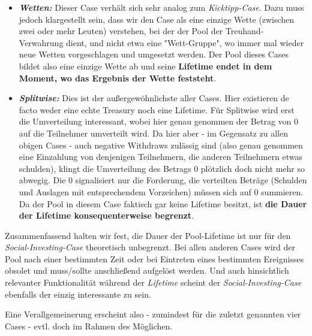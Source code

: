 \begin{itemize}
  \item \textbf{\textit{Wetten:}} Dieser Case verhält sich sehr analog zum \textit{Kicktipp-Case}. Dazu muss jedoch klargestellt sein, dass wir den Case als eine einzige Wette (zwischen zwei oder mehr Leuten) verstehen, bei der der Pool der Treuhand-Verwahrung dient, und nicht etwa eine "Wett-Gruppe", wo immer mal wieder neue Wetten vorgeschlagen und umgesetzt werden. Der Pool dieses Cases bildet also eine einzige Wette ab und seine \textbf{Lifetime endet in dem Moment, wo das Ergebnis der Wette feststeht}.
  \item \textbf{\textit{Splitwise:}} Dies ist der außergewöhnlichste aller Cases. Hier existieren de facto weder eine echte Treasury noch eine Lifetime. Für Splitwise wird erst die Umverteilung interessant, wobei hier genau genommen der Betrag von 0 auf die Teilnehmer umverteilt wird. Da hier aber - im Gegensatz zu allen obigen Cases - auch negative Withdraws zulässig sind (also genau genommen eine Einzahlung von denjenigen Teilnehmern, die anderen Teilnehmern etwas schulden), klingt die Umverteilung des Betrags 0 plötzlich doch nicht mehr so abwegig. Die 0 signalisiert nur die Forderung, die verteilten Beträge (Schulden und Auslagen mit entsprechendem Vorzeichen) müssen sich auf 0 summieren. Da der Pool in diesem Case faktisch gar keine Lifetime besitzt, ist \textbf{die Dauer der Lifetime konsequenterweise begrenzt}.
\end{itemize}

\vspace{0.3cm}

Zusammenfassend halten wir fest, die Dauer der Pool-Lifetime ist nur für den \textit{Social-Investing-Case} theoretisch unbegrenzt. Bei allen anderen Cases wird der Pool nach einer bestimmten Zeit oder bei Eintreten eines bestimmten Ereignisses obsolet und muss/sollte anschließend aufgelöst werden. Und auch hinsichtlich relevanter Funktionalität während der \textit{Lifetime} scheint der \textit{Social-Investing-Case} ebenfalls der einzig interessante zu sein. 

\vspace{0.1cm}

Eine Verallgemeinerung erscheint also - zumindest für die zuletzt genannten vier Cases - evtl. doch im Rahmen des Möglichen. 

\vspace{0.3cm}


